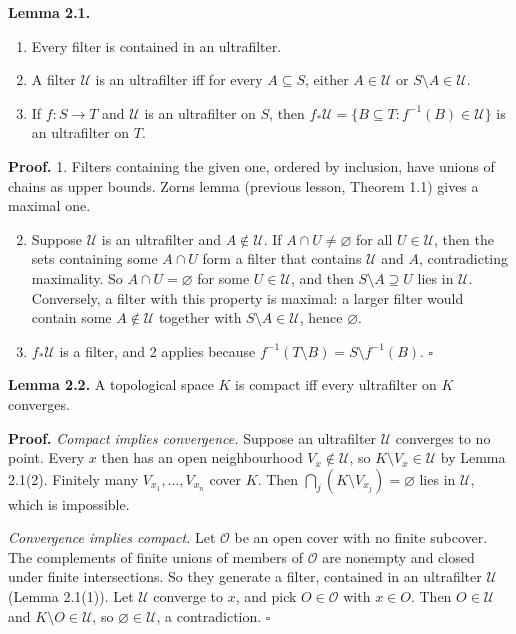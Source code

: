 \documentclass[
  english,
  11pt,
  a4paper,
]{article}
\newcounter{none} %
\providecommand{\tightlist}{%
  \setlength{\itemsep}{0pt}\setlength{\parskip}{0pt}}
\begin{document}
\textbf{Lemma 2.1.}

\begin{enumerate}
\tightlist
\item
  Every filter is contained in an ultrafilter.
\item
  A filter \(\mathcal U\) is an ultrafilter iff for every
  \(A\subseteq S\), either \(A\in\mathcal U\) or
  \(S\setminus A\in\mathcal U\).
\item
  If \(f:S\to T\) and \(\mathcal U\) is an ultrafilter on \(S\), then
  \(f_*\mathcal U=\{B\subseteq T:f^{-1}(B)\in\mathcal U\}\) is an
  ultrafilter on \(T\).
\end{enumerate}

\textbf{Proof.} 1. Filters containing the given one, ordered by
inclusion, have unions of chains as upper bounds. Zorn\textquotesingle s
lemma (previous lesson, Theorem 1.1) gives a maximal one.

\begin{enumerate}
\setcounter{enumi}{1}
\item
  Suppose \(\mathcal U\) is an ultrafilter and \(A\notin\mathcal U\). If
  \(A\cap U\neq\varnothing\) for all \(U\in\mathcal U\), then the sets
  containing some \(A\cap U\) form a filter that contains \(\mathcal U\)
  and \(A\), contradicting maximality. So \(A\cap U=\varnothing\) for
  some \(U\in\mathcal U\), and then \(S\setminus A\supseteq U\) lies in
  \(\mathcal U\). Conversely, a filter with this property is maximal: a
  larger filter would contain some \(A\notin\mathcal U\) together with
  \(S\setminus A\in\mathcal U\), hence \(\varnothing\).
\item
  \(f_*\mathcal U\) is a filter, and 2 applies because
  \(f^{-1}(T\setminus B)=S\setminus f^{-1}(B)\). \(\square\)
\end{enumerate}

\textbf{Lemma 2.2.} A topological space \(K\) is compact iff every
ultrafilter on \(K\) converges.

\textbf{Proof.} \emph{Compact implies convergence.} Suppose an
ultrafilter \(\mathcal U\) converges to no point. Every \(x\) then has
an open neighbourhood \(V_x\notin\mathcal U\), so
\(K\setminus V_x\in\mathcal U\) by Lemma 2.1(2). Finitely many
\(V_{x_1},\dots,V_{x_n}\) cover \(K\). Then
\(\bigcap_j(K\setminus V_{x_j})=\varnothing\) lies in \(\mathcal U\),
which is impossible.

\emph{Convergence implies compact.} Let \(\mathcal O\) be an open cover
with no finite subcover. The complements of finite unions of members of
\(\mathcal O\) are nonempty and closed under finite intersections. So
they generate a filter, contained in an ultrafilter \(\mathcal U\)
(Lemma 2.1(1)). Let \(\mathcal U\) converge to \(x\), and pick
\(O\in\mathcal O\) with \(x\in O\). Then \(O\in\mathcal U\) and
\(K\setminus O\in\mathcal U\), so \(\varnothing\in\mathcal U\), a
contradiction. \(\square\)
\end{document}
